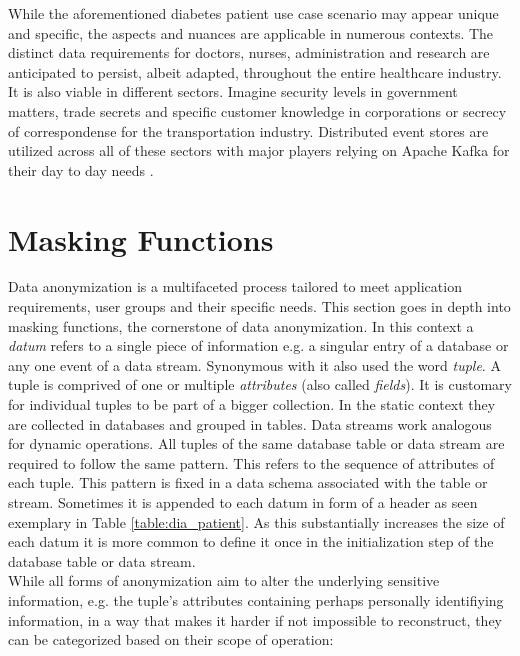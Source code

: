 While the aforementioned diabetes patient use case scenario may appear unique and specific, the aspects and nuances are applicable in numerous contexts. The distinct data requirements for doctors, nurses, administration and research are anticipated to persist, albeit adapted, throughout the entire healthcare industry. 
It is also viable in different sectors. Imagine security levels in government matters, trade secrets and specific customer knowledge in corporations or secrecy of correspondense for the transportation industry. Distributed event stores are utilized across all of these sectors with major players relying on Apache Kafka for their day to day needs \cite{KafkaPoweredBY}. 

\section{Masking Functions}
Data anonymization is a multifaceted process tailored to meet application requirements, user groups and their specific needs. This section goes in depth into masking functions, the cornerstone of data anonymization. In this context a \textit{datum} refers to a single piece of information e.g. a singular entry of a database or any one event of a data stream. Synonymous with it also used the word \textit{tuple}. A tuple is comprived of one or multiple \textit{attributes} (also called \textit{fields}). It is customary for individual tuples to be part of a bigger collection. In the static context they are collected in databases and grouped in tables. Data streams work analogous for dynamic operations. All tuples of the same database table or data stream are required to follow the same pattern. This refers to the sequence of attributes of each tuple. This pattern is fixed in a data schema associated with the table or stream. Sometimes it is appended to each datum in form of a header as seen exemplary in Table \ref{table:dia_patient}. As this substantially increases the size of each datum it is more common to define it once in the initialization step of the database table or data stream. \\
While all forms of anonymization aim to alter the underlying sensitive information, e.g. the tuple's attributes containing perhaps personally identifiying information, in a way that makes it harder if not impossible to reconstruct, they can be categorized based on their scope of operation:

